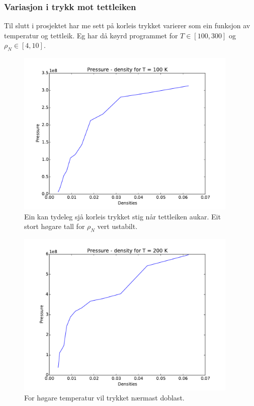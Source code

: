 \documentclass[12pt, a4paper]{article}
\theoremstyle{definition} \newtheorem*{definition}{Teorem}
\begin{document}
        \subsubsection*{Variasjon i trykk mot tettleiken}
            Til slutt i prosjektet har me sett på korleis trykket varierer som ein funksjon av temperatur og tettleik. Eg har då køyrd programmet for $T \in [100, 300]$ og 
            $\rho_N \in [4, 10]$.
            \begin{figure}[H]
                \centering
                \includegraphics[width=400px]{PD100.pdf}
                \caption{Ein kan tydeleg sjå korleis trykket stig når tettleiken aukar. Eit stort høgare tall for $\rho_N$ vert ustabilt.}
            \end{figure}
            \begin{figure}[H]
                \centering
                \includegraphics[width=400px]{PD200.pdf}
                \caption{For høgare temperatur vil trykket nærmast doblast.}
            \end{figure}
\end{document}
